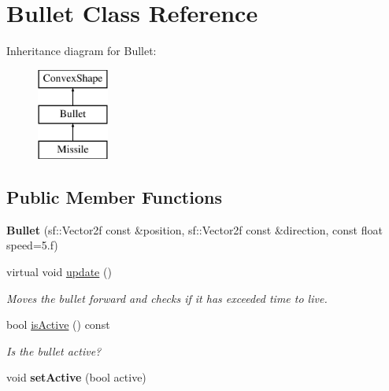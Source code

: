 \hypertarget{class_bullet}{}\section{Bullet Class Reference}
\label{class_bullet}
Inheritance diagram for Bullet\+:\begin{figure}[H]
\begin{center}
\leavevmode
\includegraphics[height=3.000000cm]{class_bullet}
\end{center}
\end{figure}
\subsection*{Public Member Functions}
\begin{DoxyCompactItemize}
\item 
\hypertarget{class_bullet_af049e550cd3848277badd21f86194c49}{}{\bfseries Bullet} (sf\+::\+Vector2f const \&position, sf\+::\+Vector2f const \&direction, const float speed=5.f)\label{class_bullet_af049e550cd3848277badd21f86194c49}

\item 
\hypertarget{class_bullet_a32f4a0611fe2dd245fee955d14ca1f68}{}virtual void \hyperlink{class_bullet_a32f4a0611fe2dd245fee955d14ca1f68}{update} ()\label{class_bullet_a32f4a0611fe2dd245fee955d14ca1f68}

\begin{DoxyCompactList}\small\item\em Moves the bullet forward and checks if it has exceeded time to live. \end{DoxyCompactList}\item 
\hypertarget{class_bullet_ac34da8003c6bc44bddfabce81411bed8}{}bool \hyperlink{class_bullet_ac34da8003c6bc44bddfabce81411bed8}{is\+Active} () const \label{class_bullet_ac34da8003c6bc44bddfabce81411bed8}

\begin{DoxyCompactList}\small\item\em Is the bullet active? \end{DoxyCompactList}\item 
\hypertarget{class_bullet_a3b790871b9487ef3cf5bf956354c8639}{}void {\bfseries set\+Active} (bool active)\label{class_bullet_a3b790871b9487ef3cf5bf956354c8639}

\end{DoxyCompactItemize}
